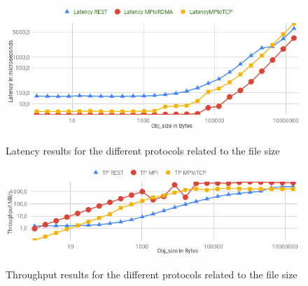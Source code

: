 \documentclass[runningheads]{llncs}
\begin{document}
\begin{figure}
    \centering
    \begin{minipage}{0.49\textwidth}
        \centering\vspace{-2em}
        \includegraphics[width=1\textwidth]{latency-rest-mpi.png}\vspace{-1em}
        \caption{Latency results for the different protocols related to the file size}\vspace{-1.5em}
		\label{fig:latency-rest-mpi}
    \end{minipage}\hfill
    \begin{minipage}{0.49\textwidth}
        \centering\vspace{-2em}
        \includegraphics[width=1\textwidth]{throughput-rest-mpi.png}\vspace{-1em}
        \caption{Throughput results for the different protocols related to the file size}\vspace{-1.5em}
		\label{fig:throughput-rest-mpi}
    \end{minipage}
\end{figure}
\vspace{-2em}
\end{document}
